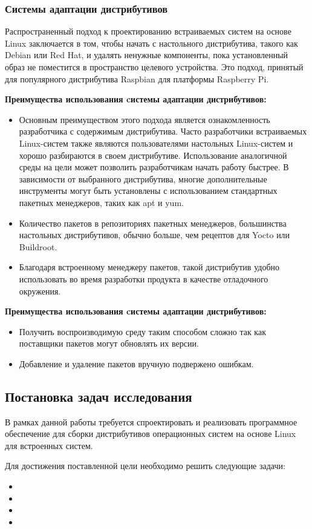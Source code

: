 \newpage
\subsubsection{Системы адаптации дистрибутивов}
Распространенный подход к проектированию встраиваемых систем на основе Linux заключается в том, чтобы начать с настольного дистрибутива, такого как Debian или Red Hat, и удалять ненужные компоненты, пока установленный образ не поместится в пространство целевого устройства\cite{ARMBIAN}. Это подход, принятый для популярного дистрибутива Raspbian для платформы Raspberry Pi.

\textbf{Преимущества использования cистемы адаптации дистрибутивов:}
\begin{itemize}
  \item Основным преимуществом этого подхода является ознакомленность разработчика с содержимым дистрибутива. 
Часто разработчики встраиваемых Linux-систем также являются пользователями настольных Linux-систем и хорошо разбираются в своем дистрибутиве. 
Использование аналогичной среды на цели может позволить разработчикам начать работу быстрее. 
В зависимости от выбранного дистрибутива, многие дополнительные инструменты могут быть установлены с использованием стандартных пакетных менеджеров, таких как apt и yum.
  \item Количество пакетов в репозиториях пакетных менеджеров, большинства настольных дистрибутивов, обычно больше, чем рецептов для Yocto или Buildroot.
  \item Благодаря встроенному менеджеру пакетов, такой дистрибутив удобно использовать во время разработки продукта в качестве отладочного окружения.
\end{itemize}
\textbf{Преимущества использования cистемы адаптации дистрибутивов:}
\begin{itemize}
  \item Получить воспроизводимую среду таким способом сложно так как поставщики пакетов могут обновлять их версии.
  \item Добавление и удаление пакетов вручную подвержено ошибкам.
\end{itemize}

\newpage
\subsection{Постановка задач исследования}
В рамках данной работы требуется спроектировать и реализовать программное обеспечение для сборки дистрибутивов операционных систем на основе Linux для встроенных систем.

Для достижения поставленной цели необходимо решить следующие задачи:
\begin{itemize}
  \item 
  \item 
  \item 
  \item 
\end{itemize}
\newpage
